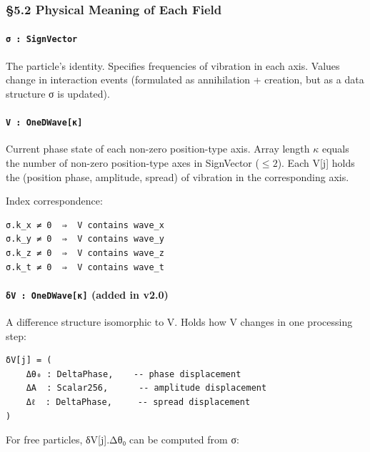\documentclass[a4paper,11pt]{article}
\begin{document}
\subsubsection{§5.2 Physical Meaning of Each
Field}\label{physical-meaning-of-each-field}

\paragraph{\texorpdfstring{\texttt{σ\ :\ SignVector}}{σ : SignVector}}\label{ux3c3-signvector}

The particle's identity. Specifies frequencies of vibration in each
axis. Values change in interaction events (formulated as annihilation +
creation, but as a data structure σ is updated).

\paragraph{\texorpdfstring{\texttt{V\ :\ OneDWave{[}κ{]}}}{V : OneDWave{[}κ{]}}}\label{v-onedwaveux3ba}

Current phase state of each non-zero position-type axis. Array length
\(\kappa\) equals the number of non-zero position-type axes in
SignVector (\(\leq 2\)). Each V{[}j{]} holds the (position phase,
amplitude, spread) of vibration in the corresponding axis.

Index correspondence:

\begin{verbatim}
σ.k_x ≠ 0  ⇒  V contains wave_x
σ.k_y ≠ 0  ⇒  V contains wave_y
σ.k_z ≠ 0  ⇒  V contains wave_z
σ.k_t ≠ 0  ⇒  V contains wave_t
\end{verbatim}

\paragraph{\texorpdfstring{\texttt{δV\ :\ OneDWave{[}κ{]}} (added in
v2.0)}{δV : OneDWave{[}κ{]} (added in v2.0)}}\label{ux3b4v-onedwaveux3ba-added-in-v2.0}

A difference structure isomorphic to V. Holds how V changes in one
processing step:

\begin{verbatim}
δV[j] = (
    Δθ₀ : DeltaPhase,    -- phase displacement
    ΔA  : Scalar256,      -- amplitude displacement
    Δℓ  : DeltaPhase,     -- spread displacement
)
\end{verbatim}

For free particles, δV{[}j{]}.Δθ₀ can be computed from σ:
\end{document}
